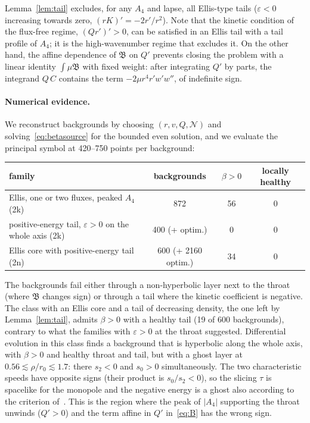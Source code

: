 \documentclass[11pt,a4paper]{article}
\theoremstyle{remark}
\newcommand{\Ncal}{\mathcal N}
\newcommand{\B}{\mathfrak B}
\begin{document}
Lemma~\ref{lem:tail} excludes, for any $A_4$ and lapse, all Ellis-type tails ($\varepsilon<0$ increasing towards zero, $(rK)'=-2r'/r^2$). Note that the kinetic condition of the flux-free regime, $(Qr')'>0$, can be satisfied in an Ellis tail with a tail profile of $A_4$; it is the high-wavenumber regime that excludes it. On the other hand, the affine dependence of $\B$ on $Q'$ prevents closing the problem with a linear identity $\int\mu\B$ with fixed weight: after integrating $Q'$ by parts, the integrand $Q\,C$ contains the term $-2\mu r^4r'w'w''$, of indefinite sign.

\paragraph{Numerical evidence.} We reconstruct backgrounds by choosing $(r,v,Q,\Ncal)$ and solving~\eqref{eq:betasource} for the bounded even solution, and we evaluate the principal symbol at 420--750 points per background:
\begin{center}
\small\begin{tabular}{p{6.2cm}ccc}
\toprule
family & backgrounds & $\beta>0$ & locally healthy \\
\midrule
Ellis, one or two fluxes, peaked $A_4$ (2k) & 872 & 56 & 0 \\
positive-energy tail, $\varepsilon>0$ on the whole axis (2k) & 400 (+ optim.) & 0 & 0 \\
Ellis core with positive-energy tail (2n) & 600 (+ 2160 optim.) & 34 & 0 \\
\bottomrule
\end{tabular}
\end{center}
The backgrounds fail either through a non-hyperbolic layer next to the throat (where $\B$ changes sign) or through a tail where the kinetic coefficient is negative. The class with an Ellis core and a tail of decreasing density, the one left by Lemma~\ref{lem:tail}, admits $\beta>0$ with a healthy tail (19 of 600 backgrounds), contrary to what the families with $\varepsilon>0$ at the throat suggested. Differential evolution in this class finds a background that is hyperbolic along the whole axis, with $\beta>0$ and healthy throat and tail, but with a ghost layer at $0.56\lesssim\rho/r_0\lesssim1.7$: there $s_2<0$ and $s_0>0$ simultaneously. The two characteristic speeds have opposite signs (their product is $s_0/s_2<0$), so the slicing $\tau$ is spacelike for the monopole and the negative energy is a ghost also according to the criterion of~\cite{BCEL2}. This is the region where the peak of $|A_4|$ supporting the throat unwinds ($Q'>0$) and the term affine in $Q'$ in~\eqref{eq:B} has the wrong sign.
\end{document}
